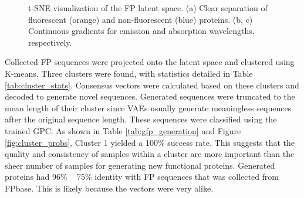 \documentclass[unnumsec,webpdf,contemporary,medium]{oup-authoring-template}
\begin{document}
\begin{figure}[htbp]
    \centering
    \hfill
    \hfill
    \caption{t-SNE visualization of the FP latent space. (a) Clear separation of fluorescent (orange) and non-fluorescent (blue) proteins. (b, c) Continuous gradients for emission and absorption wavelengths, respectively.}
    \label{fig:tsne}
\end{figure}

Collected FP sequences were projected onto the latent space and clustered using K-means. Three clusters were found, with statistics detailed in Table \ref{tab:cluster_stats}. Consensus vectors were calculated based on these clusters and decoded to generate novel sequences. Generated sequences were truncated to the mean length of their cluster since VAEs usually generate meaningless sequences after the original sequence length. These sequences were classified using the trained GPC. As shown in Table \ref{tab:gfp_generation} and Figure \ref{fig:cluster_probs}, Cluster 1 yielded a 100\% success rate. This suggests that the quality and consistency of samples within a cluster are more important than the sheer number of samples for generating new functional proteins. Generated proteins had 96\% ~ 75\% identity with FP sequences that was collected from FPbase. This is likely because the vectors were very alike.
\end{document}
